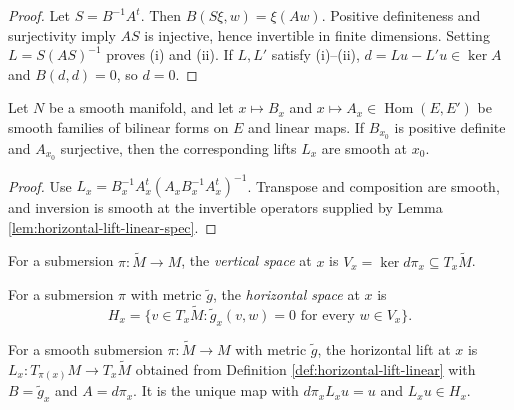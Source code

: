 \begin{proof}
\leanok
{}
\sketch Let $S=B^{-1}A^t$. Then $B(S\xi,w)=\xi(Aw)$. Positive definiteness and surjectivity imply $AS$ is injective, hence invertible in finite dimensions. Setting $L=S(AS)^{-1}$ proves (i) and (ii). If $L,L'$ satisfy (i)--(ii), $d=Lu-L'u\in\ker A$ and $B(d,d)=0$, so $d=0$.
\end{proof}

\begin{lemma}
\label{lem:horizontal-lift-smooth-in-data}
\leanok
{}
Let $N$ be a smooth manifold, and let $x\mapsto B_x$ and $x\mapsto A_x\in\operatorname{Hom}(E,E')$ be smooth families of bilinear forms on $E$ and linear maps. If $B_{x_0}$ is positive definite and $A_{x_0}$ surjective, then the corresponding lifts $L_x$ are smooth at $x_0$.
\end{lemma}

\begin{proof}
\leanok
{}
\sketch Use $L_x=B_x^{-1}A_x^t(A_xB_x^{-1}A_x^t)^{-1}$. Transpose and composition are smooth, and inversion is smooth at the invertible operators supplied by Lemma \ref{lem:horizontal-lift-linear-spec}.
\end{proof}

\begin{definition}
\label{def:vertical-space}
\leanok
{}
For a submersion $\pi:\tilde M\to M$, the \emph{vertical space} at $x$ is $V_x=\ker d\pi_x\subseteq T_x\tilde M$.
\end{definition}

\begin{definition}
\label{def:horizontal-space}
\leanok
{}
For a submersion $\pi$ with metric $\tilde g$, the \emph{horizontal space} at $x$ is
\[
H_x=\{v\in T_x\tilde M:\tilde g_x(v,w)=0\text{ for every }w\in V_x\}.
\]
\end{definition}

\begin{definition}
\label{def:horizontal-lift-tangent}
\leanok
{}
For a smooth submersion $\pi:\tilde M\to M$ with metric $\tilde g$, the horizontal lift at $x$ is $L_x:T_{\pi(x)}M\to T_x\tilde M$ obtained from Definition \ref{def:horizontal-lift-linear} with $B=\tilde g_x$ and $A=d\pi_x$. It is the unique map with $d\pi_xL_xu=u$ and $L_xu\in H_x$.
\end{definition}


